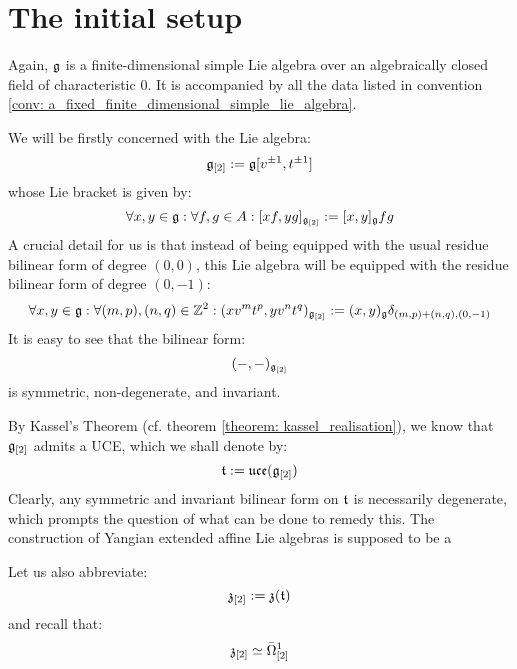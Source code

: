 \section{The initial setup}
    Again, $\mathfrak{g}$ is a finite-dimensional simple Lie algebra over an algebraically closed field of characteristic $0$. It is accompanied by all the data listed in convention \ref{conv: a_fixed_finite_dimensional_simple_lie_algebra}.

    We will be firstly concerned with the Lie algebra:
        $$\mathfrak{g}_{[2]} := \mathfrak{g}[v^{\pm 1}, t^{\pm 1}]$$
    whose Lie bracket is given by:
        $$\forall x, y \in \mathfrak{g}: \forall f, g \in A: [x f, y g]_{\mathfrak{g}_{[2]}} := [x, y]_{\mathfrak{g}} fg$$
    A crucial detail for us is that instead of being equipped with the usual residue bilinear form of degree $(0, 0)$, this Lie algebra will be equipped with the residue bilinear form of degree $(0, -1)$:
        $$\forall x, y \in \mathfrak{g}: \forall (m, p), (n, q) \in \mathbb{Z}^2: (x v^m t^p, y v^n t^q)_{\mathfrak{g}_{[2]}} := (x, y)_{\mathfrak{g}} \delta_{(m, p) + (n, q), (0, -1)}$$
    It is easy to see that the bilinear form:
        $$(-, -)_{\mathfrak{g}_{[2]}}$$
    is symmetric, non-degenerate, and invariant. 

    By Kassel's Theorem (cf. theorem \ref{theorem: kassel_realisation}), we know that $\mathfrak{g}_{[2]}$ admits a UCE, which we shall denote by:
        $$\mathfrak{t} := \mathfrak{uce}(\mathfrak{g}_{[2]})$$
    Clearly, any symmetric and invariant bilinear form on $\mathfrak{t}$ is necessarily degenerate, which prompts the question of what can be done to remedy this. The construction of Yangian extended affine Lie algebras is supposed to be a 

    Let us also abbreviate:
        $$\mathfrak{z}_{[2]} := \mathfrak{z}(\mathfrak{t})$$
    and recall that:
        $$\mathfrak{z}_{[2]} \simeq \bar{\Omega}^1_{[2]}$$